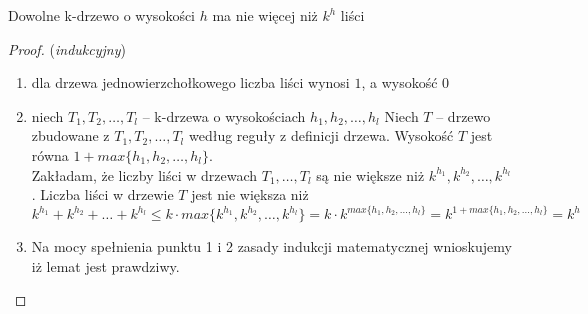 	\begin{lemat}
		Dowolne k-drzewo o wysokości $h$ ma nie więcej niż $k^h$ liści
		\begin{proof} (\emph{indukcyjny})\\
			\begin{enumerate}
				\item dla drzewa jednowierzchołkowego liczba liści wynosi $1$, a wysokość $0$
				\item niech $T_1, T_2, \dots, T_l$ -- k-drzewa o wysokościach $h_1, h_2, \dots, h_l$
				Niech $T$ -- drzewo zbudowane z $T_1, T_2, \dots, T_l$ według reguły z definicji drzewa. 
				Wysokość $T$ jest równa $1 + max\{h_1, h_2, \dots, h_l\}$.\\
				Zakładam, że liczby liści w drzewach $T_1, \dots, T_l$ są nie większe niż $k^{h_1}, k^{h_2}, \dots, k^{h_l}$. 
				Liczba liści w drzewie $T$ jest nie większa niż 
				$$k^{h_1} + k^{h_2} + \dots + k^{h_l} \leqslant k\cdot max\{k^{h_1}, k^{h_2}, \dots, k^{h_l}\} = k\cdot k^{max\{h_1, h_2, \dots, h_l\}} 
				= k^{1 + max\{h_1, h_2, \dots, h_l\}} = k^h$$
				\item Na mocy spełnienia punktu 1 i 2 zasady indukcji matematycznej wnioskujemy iż lemat jest prawdziwy.
			\end{enumerate}
		\end{proof}
	\end{lemat}
	